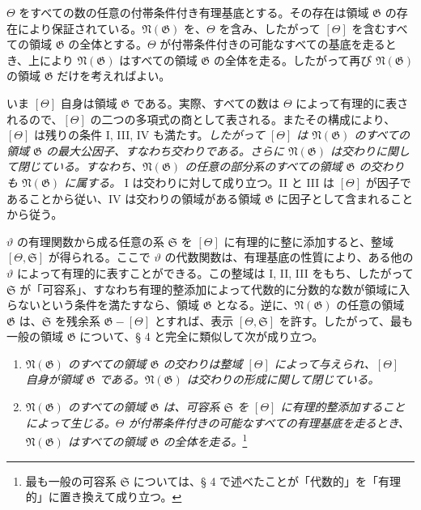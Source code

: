\documentclass[11pt]{article}
\begin{document}
$\Theta$ をすべての数の任意の付帯条件付き有理基底とする。その存在は領域 $\mathfrak G$ の存在により保証されている。$\mathfrak N(\mathfrak G)$ を、$\Theta$ を含み、したがって $[\Theta]$ を含むすべての領域 $\mathfrak G$ の全体とする。$\Theta$ が付帯条件付きの可能なすべての基底を走るとき、上により $\mathfrak N(\mathfrak G)$ はすべての領域 $\mathfrak G$ の全体を走る。したがって再び $\mathfrak N(\mathfrak G)$ の領域 $\mathfrak G$ だけを考えればよい。

いま $[\Theta]$ 自身は領域 $\mathfrak G$ である。実際、すべての数は $\Theta$ によって有理的に表されるので、$[\Theta]$ の二つの多項式の商として表される。またその構成により、$[\Theta]$ は残りの条件 I, III, IV も満たす。\emph{したがって $[\Theta]$ は $\mathfrak N(\mathfrak G)$ のすべての領域 $\mathfrak G$ の最大公因子、すなわち交わりである。さらに $\mathfrak N(\mathfrak G)$ は交わりに関して閉じている。すなわち、$\mathfrak N(\mathfrak G)$ の任意の部分系のすべての領域 $\mathfrak G$ の交わりも $\mathfrak N(\mathfrak G)$ に属する。} I は交わりに対して成り立つ。II と III は $[\Theta]$ が因子であることから従い、IV は交わりの領域がある領域 $\mathfrak G$ に因子として含まれることから従う。

$\vartheta$ の有理関数から成る任意の系 $\mathfrak S$ を $[\Theta]$ に有理的に整に添加すると、整域 $[\Theta,\mathfrak S]$ が得られる。ここで $\vartheta$ の代数関数は、有理基底の性質により、ある他の $\vartheta$ によって有理的に表すことができる。この整域は I, II, III をもち、したがって $\mathfrak S$ が「可容系」、すなわち有理的整添加によって代数的に分数的な数が領域に入らないという条件を満たすなら、領域 $\mathfrak G$ となる。逆に、$\mathfrak N(\mathfrak G)$ の任意の領域 $\mathfrak G$ は、$\mathfrak S$ を残余系 $\mathfrak G-[\Theta]$ とすれば、表示 $[\Theta,\mathfrak S]$ を許す。したがって、最も一般の領域 $\mathfrak G$ について、§ 4 と完全に類似して次が成り立つ。
\begin{enumerate}
\item[a)] \emph{$\mathfrak N(\mathfrak G)$ のすべての領域 $\mathfrak G$ の交わりは整域 $[\Theta]$ によって与えられ、$[\Theta]$ 自身が領域 $\mathfrak G$ である。$\mathfrak N(\mathfrak G)$ は交わりの形成に関して閉じている。}
\item[b)] \emph{$\mathfrak N(\mathfrak G)$ のすべての領域 $\mathfrak G$ は、可容系 $\mathfrak S$ を $[\Theta]$ に有理的整添加することによって生じる。$\Theta$ が付帯条件付きの可能なすべての有理基底を走るとき、$\mathfrak N(\mathfrak G)$ はすべての領域 $\mathfrak G$ の全体を走る。}\footnote{最も一般の可容系 $\mathfrak S$ については、§ 4 で述べたことが「代数的」を「有理的」に置き換えて成り立つ。}
\end{enumerate}
\end{document}
